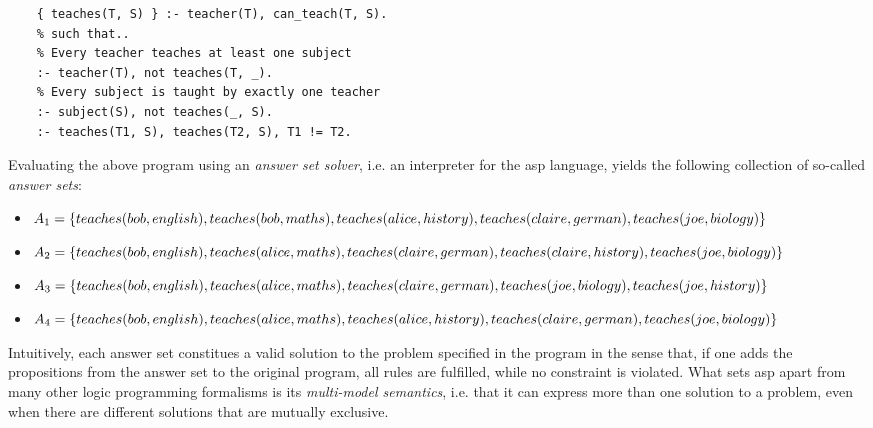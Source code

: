 \begin{example}
\begin{lstlisting}[style=asp-code, caption=School planning in ASP, label={lst:school-planning}]
    % Assign subjects to teachers
    { teaches(T, S) } :- teacher(T), can_teach(T, S).
    % such that..
    % Every teacher teaches at least one subject
    :- teacher(T), not teaches(T, _).
    % Every subject is taught by exactly one teacher
    :- subject(S), not teaches(_, S).
    :- teaches(T1, S), teaches(T2, S), T1 != T2.
\end{lstlisting}    
Evaluating the above program using an \emph{answer set solver}, i.e. an interpreter for the \gls{asp} language, yields the following collection of so-called \emph{answer sets}:
\begin{itemize}
    \item $A_1 = \{teaches(bob,english), teaches(bob,maths), teaches(alice,history),\\teaches(claire,german), teaches(joe,biology)\}$
    \item $A_2 = \{teaches(bob,english), teaches(alice,maths), teaches(claire,german),\\teaches(claire,history), teaches(joe,biology)\}$
    \item $A_3 = \{teaches(bob,english), teaches(alice,maths), teaches(claire,german),\\teaches(joe,biology), teaches(joe,history)\}$
    \item $A_4 = \{teaches(bob,english), teaches(alice,maths), teaches(alice,history),\\teaches(claire,german), teaches(joe,biology)\}$
\end{itemize}
Intuitively, each answer set constitues a valid solution to the problem specified in the program in the sense that, if one adds the propositions from the answer set to the original program, all rules are fulfilled, while no constraint is violated. What sets \gls{asp} apart from many other logic programming formalisms is its \emph{multi-model semantics}, i.e. that it can express more than one solution to a problem, even when there are different solutions that are mutually exclusive.
\end{example}    


